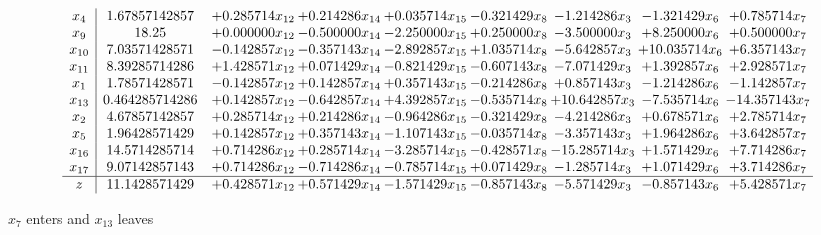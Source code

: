 \documentclass[10pt]{article}
\begin{document}
 \[\begin{array}{c| c c@{\hskip 2pt} c@{\hskip 2pt} c@{\hskip 2pt} c@{\hskip 2pt} c@{\hskip 2pt} c@{\hskip 2pt} c@{\hskip 2pt} }
 x_{4}   &  1.67857142857 & + 0.285714 x_{12} & + 0.214286 x_{14} & + 0.035714 x_{15} & -0.321429 x_{8} & -1.214286 x_{3} & -1.321429 x_{6} & + 0.785714 x_{7}\\
 x_{9}   &  18.25 & + 0.000000 x_{12} & -0.500000 x_{14} & -2.250000 x_{15} & + 0.250000 x_{8} & -3.500000 x_{3} & + 8.250000 x_{6} & + 0.500000 x_{7}\\
 x_{10}   &  7.03571428571 & -0.142857 x_{12} & -0.357143 x_{14} & -2.892857 x_{15} & + 1.035714 x_{8} & -5.642857 x_{3} & + 10.035714 x_{6} & + 6.357143 x_{7}\\
 x_{11}   &  8.39285714286 & + 1.428571 x_{12} & + 0.071429 x_{14} & -0.821429 x_{15} & -0.607143 x_{8} & -7.071429 x_{3} & + 1.392857 x_{6} & + 2.928571 x_{7}\\
 x_{1}   &  1.78571428571 & -0.142857 x_{12} & + 0.142857 x_{14} & + 0.357143 x_{15} & -0.214286 x_{8} & + 0.857143 x_{3} & -1.214286 x_{6} & -1.142857 x_{7}\\
 x_{13}   &  0.464285714286 & + 0.142857 x_{12} & -0.642857 x_{14} & + 4.392857 x_{15} & -0.535714 x_{8} & + 10.642857 x_{3} & -7.535714 x_{6} & -14.357143 x_{7}\\
 x_{2}   &  4.67857142857 & + 0.285714 x_{12} & + 0.214286 x_{14} & -0.964286 x_{15} & -0.321429 x_{8} & -4.214286 x_{3} & + 0.678571 x_{6} & + 2.785714 x_{7}\\
 x_{5}   &  1.96428571429 & + 0.142857 x_{12} & + 0.357143 x_{14} & -1.107143 x_{15} & -0.035714 x_{8} & -3.357143 x_{3} & + 1.964286 x_{6} & + 3.642857 x_{7}\\
 x_{16}   &  14.5714285714 & + 0.714286 x_{12} & + 0.285714 x_{14} & -3.285714 x_{15} & -0.428571 x_{8} & -15.285714 x_{3} & + 1.571429 x_{6} & + 7.714286 x_{7}\\
 x_{17}   &  9.07142857143 & + 0.714286 x_{12} & -0.714286 x_{14} & -0.785714 x_{15} & + 0.071429 x_{8} & -1.285714 x_{3} & + 1.071429 x_{6} & + 3.714286 x_{7}\\
\hline
z    &  11.1428571429 & + 0.428571 x_{12} & + 0.571429 x_{14} & -1.571429 x_{15} & -0.857143 x_{8} & -5.571429 x_{3} & -0.857143 x_{6} & + 5.428571 x_{7}\\
\end{array}\]


 $ x_{7} $ enters and $ x_{13} $ leaves 
\end{document}
